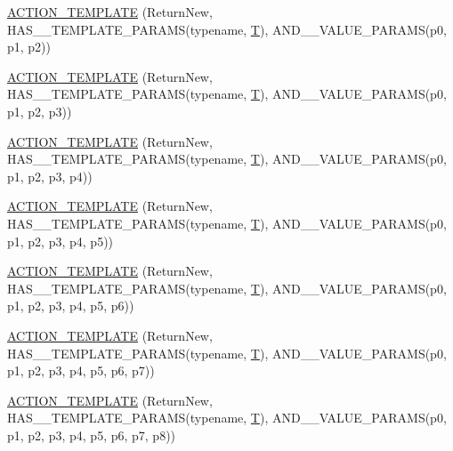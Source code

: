 \begin{DoxyCompactItemize}
\item 
\hyperlink{namespacetesting_ac24511eb64ebe2c2927feaf285ac3785}{A\+C\+T\+I\+O\+N\+\_\+\+T\+E\+M\+P\+L\+A\+TE} (Return\+New, H\+A\+S\+\_\+\_\+\+T\+E\+M\+P\+L\+A\+T\+E\+\_\+\+P\+A\+R\+A\+MS(typename, \hyperlink{functions__7_8js_adf1f3edb9115acb0a1e04209b7a9937b}{T}), A\+N\+D\+\_\+\_\+\+V\+A\+L\+U\+E\+\_\+\+P\+A\+R\+A\+MS(p0, p1, p2))
\item 
\hyperlink{namespacetesting_afc5a3710d11bdee2023d8402b84d86ed}{A\+C\+T\+I\+O\+N\+\_\+\+T\+E\+M\+P\+L\+A\+TE} (Return\+New, H\+A\+S\+\_\+\_\+\+T\+E\+M\+P\+L\+A\+T\+E\+\_\+\+P\+A\+R\+A\+MS(typename, \hyperlink{functions__7_8js_adf1f3edb9115acb0a1e04209b7a9937b}{T}), A\+N\+D\+\_\+\_\+\+V\+A\+L\+U\+E\+\_\+\+P\+A\+R\+A\+MS(p0, p1, p2, p3))
\item 
\hyperlink{namespacetesting_a0c03444379adfb849db243829946c1ed}{A\+C\+T\+I\+O\+N\+\_\+\+T\+E\+M\+P\+L\+A\+TE} (Return\+New, H\+A\+S\+\_\+\_\+\+T\+E\+M\+P\+L\+A\+T\+E\+\_\+\+P\+A\+R\+A\+MS(typename, \hyperlink{functions__7_8js_adf1f3edb9115acb0a1e04209b7a9937b}{T}), A\+N\+D\+\_\+\_\+\+V\+A\+L\+U\+E\+\_\+\+P\+A\+R\+A\+MS(p0, p1, p2, p3, p4))
\item 
\hyperlink{namespacetesting_a2ef1b31693ee2be0bb93602b375fb9ce}{A\+C\+T\+I\+O\+N\+\_\+\+T\+E\+M\+P\+L\+A\+TE} (Return\+New, H\+A\+S\+\_\+\_\+\+T\+E\+M\+P\+L\+A\+T\+E\+\_\+\+P\+A\+R\+A\+MS(typename, \hyperlink{functions__7_8js_adf1f3edb9115acb0a1e04209b7a9937b}{T}), A\+N\+D\+\_\+\_\+\+V\+A\+L\+U\+E\+\_\+\+P\+A\+R\+A\+MS(p0, p1, p2, p3, p4, p5))
\item 
\hyperlink{namespacetesting_a7b4cfa09367e9938561eeca5a105d183}{A\+C\+T\+I\+O\+N\+\_\+\+T\+E\+M\+P\+L\+A\+TE} (Return\+New, H\+A\+S\+\_\+\_\+\+T\+E\+M\+P\+L\+A\+T\+E\+\_\+\+P\+A\+R\+A\+MS(typename, \hyperlink{functions__7_8js_adf1f3edb9115acb0a1e04209b7a9937b}{T}), A\+N\+D\+\_\+\_\+\+V\+A\+L\+U\+E\+\_\+\+P\+A\+R\+A\+MS(p0, p1, p2, p3, p4, p5, p6))
\item 
\hyperlink{namespacetesting_a76d58331453ee0a2eb75a5992e35197b}{A\+C\+T\+I\+O\+N\+\_\+\+T\+E\+M\+P\+L\+A\+TE} (Return\+New, H\+A\+S\+\_\+\_\+\+T\+E\+M\+P\+L\+A\+T\+E\+\_\+\+P\+A\+R\+A\+MS(typename, \hyperlink{functions__7_8js_adf1f3edb9115acb0a1e04209b7a9937b}{T}), A\+N\+D\+\_\+\_\+\+V\+A\+L\+U\+E\+\_\+\+P\+A\+R\+A\+MS(p0, p1, p2, p3, p4, p5, p6, p7))
\item 
\hyperlink{namespacetesting_adfb5791a941ec1f2a2f8067fd9ac7667}{A\+C\+T\+I\+O\+N\+\_\+\+T\+E\+M\+P\+L\+A\+TE} (Return\+New, H\+A\+S\+\_\+\_\+\+T\+E\+M\+P\+L\+A\+T\+E\+\_\+\+P\+A\+R\+A\+MS(typename, \hyperlink{functions__7_8js_adf1f3edb9115acb0a1e04209b7a9937b}{T}), A\+N\+D\+\_\+\_\+\+V\+A\+L\+U\+E\+\_\+\+P\+A\+R\+A\+MS(p0, p1, p2, p3, p4, p5, p6, p7, p8))

\end{DoxyCompactItemize}
